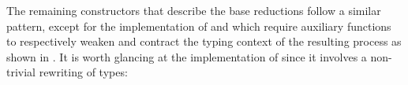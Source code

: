 \begin{code}[hide]
\>[43]\AgdaSpace{}%
\AgdaSymbol{(}\AgdaSpace{}%
\AgdaSymbol{(}\AgdaSpace{}%
\AgdaSpace{}%
\AgdaOperator{\AgdaInductiveConstructor{<}}\AgdaSpace{}%
\AgdaSpace{}%
\AgdaSpace{}%
\AgdaSymbol{(}\AgdaSpace{}%
\AgdaOperator{\AgdaInductiveConstructor{,}}\AgdaSpace{}%
\AgdaSymbol{))}\AgdaSpace{}%
\AgdaSpace{}%
\AgdaOperator{\AgdaInductiveConstructor{>}}\AgdaSpace{}%
\AgdaSpace{}%
\AgdaSpace{}%
\AgdaSpace{}%
\AgdaSymbol{)))}\<%
\end{code}

The remaining constructors that describe the base reductions follow a similar
pattern, except for the implementation of \RWeaken and \RContract which require
auxiliary functions to respectively weaken and contract the typing context of
the resulting process as shown in . It is worth glancing at
the implementation of \RExists since it involves a non-trivial rewriting of
types:

